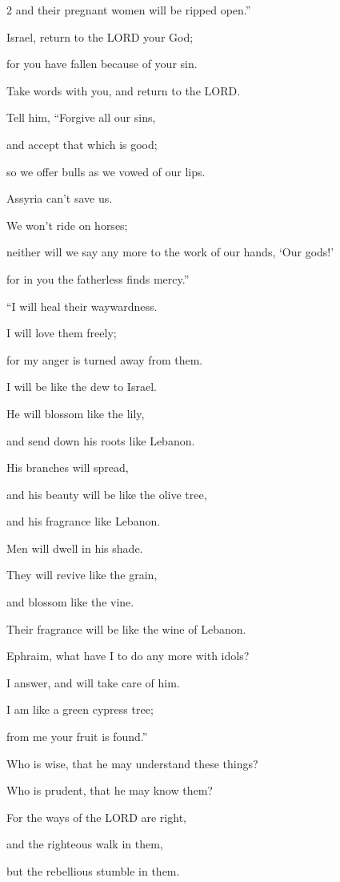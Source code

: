 \begin{multicols}{2}
and their pregnant women will be ripped open.”

\mychapter{} \myverse*{}Israel, return to the LORD your God;

\quad\quad for you have fallen because of your sin.

\myverse{}Take words with you, and return to the LORD.

Tell him, “Forgive all our sins,

and accept that which is good;

so we offer bulls as we vowed of our lips.

\myverse{}Assyria can’t save us.

We won’t ride on horses;

neither will we say any more to the work of our hands, ‘Our gods!’

for in you the fatherless finds mercy.”


\vspace{\baselineskip} \myverse{}“I will heal their waywardness.

I will love them freely;

for my anger is turned away from them.

\myverse{}I will be like the dew to Israel.

He will blossom like the lily,

and send down his roots like Lebanon.

\myverse{}His branches will spread,

and his beauty will be like the olive tree,

and his fragrance like Lebanon.

\myverse{}Men will dwell in his shade.

They will revive like the grain,

and blossom like the vine.

Their fragrance will be like the wine of Lebanon.

\myverse{}Ephraim, what have I to do any more with idols?

I answer, and will take care of him.

I am like a green cypress tree;

from me your fruit is found.”


\vspace{\baselineskip} \myverse{}Who is wise, that he may understand these things?

Who is prudent, that he may know them?

For the ways of the LORD are right,

and the righteous walk in them,

but the rebellious stumble in them.

\end{multicols}
